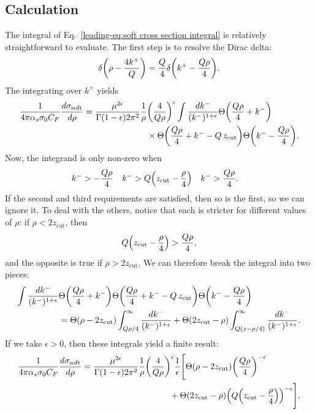 \documentclass[../thesis.tex]{subfiles}
\providecommand{\zcut}{z_\mathrm{{cut}}}
\begin{document}
\subsection{Calculation}
	The integral of Eq.~\ref{leading-eq:soft cross section integral} is relatively straightforward to evaluate. The first step is to resolve the Dirac delta:
	\begin{equation}
		\delta\qty(\rho - \frac{4k^+}{Q}) = \frac{Q}{4}\delta\qty(k^+ - \frac{Q\rho}{4}).
	\end{equation}
	The integrating over $k^+$ yields
	\begin{equation}
	\begin{aligned}
		\frac{1}{4\pi\alpha_s\sigma_0 C_F}\frac{d\sigma_{\text{soft}}}{d\rho} = \frac{\mu^{2\epsilon}}{\Gamma(1-\epsilon)2\pi^2} \frac{1}{\rho} &\qty(\frac{4}{Q\rho})^{\epsilon} \int \frac{dk^- }{(k^-)^{1+\epsilon}}\Theta\qty(\frac{Q \rho}{4} + k^-)  \\
		&\times \Theta\qty(\frac{Q\rho}{4} + k^- - Q\,\zcut)\Theta\qty(k^- - \frac{Q\rho}{4}).
	\end{aligned}
	\end{equation}
	Now, the integrand is only non-zero when
	\begin{align}
		k^- &> -\frac{Q\rho}{4} & k^- &> Q\qty(\zcut - \frac{\rho}{4}) & k^- &> \frac{Q\rho}{4}.
	\end{align}
	If the second and third requirements are satisfied, then so is the first, so we can ignore it. To deal with the others, notice that each is stricter for different values of $\rho$: if $\rho < 2\zcut$, then
	\begin{equation}
		Q\qty(\zcut - \frac{\rho}{4}) > \frac{Q\rho}{4},
	\end{equation}
	and the opposite is true if $\rho > 2\zcut$. We can therefore break the integral into two pieces:
	\begin{equation}
	\begin{aligned}
		\int \frac{dk^- }{(k^-)^{1+\epsilon}}&\Theta\qty(\frac{Q \rho}{4} + k^-) \Theta\qty(\frac{Q\rho}{4} + k^- - Q\,\zcut)\Theta\qty(k^- - \frac{Q\rho}{4}) \\
		&= \Theta\qty(\rho - 2\zcut) \int_{Q\rho/4}^\infty \frac{dk^-}{(k^-)^{1+\epsilon}} + \Theta(2\zcut - \rho) \int_{Q(z - \rho/4)}^\infty \frac{dk^-}{(k^-)^{1+\epsilon}}.
	\end{aligned}
	\end{equation}
	If we take $\epsilon > 0$, then these integrals yield a finite result:
	\begin{equation}
	\begin{aligned}
		\frac{1}{4\pi\alpha_s\sigma_0 C_F}\frac{d\sigma_{\text{soft}}}{d\rho} = \frac{\mu^{2\epsilon}}{\Gamma(1-\epsilon)2\pi^2} \frac{1}{\rho} &\qty(\frac{4}{Q\rho})^{\epsilon} \frac{1}{\epsilon}\Bigg[\Theta(\rho - 2\zcut)\qty(\frac{Q\rho}{4})^{-\epsilon} \\
			&\hspace{1cm}+ \Theta(2\zcut - \rho)\qty(Q\qty(\zcut - \frac{\rho}{4}))^{-\epsilon}\Bigg].
	\end{aligned}
	\end{equation}
\end{document}
